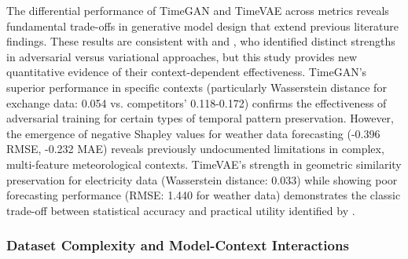 \documentclass{article}
\begin{document}
The differential performance of TimeGAN and TimeVAE across metrics reveals fundamental trade-offs in generative model design that extend previous literature findings. These results are consistent with \cite{yoon_time-series_2019} and \cite{desai_timevae_2021}, who identified distinct strengths in adversarial versus variational approaches, but this study provides new quantitative evidence of their context-dependent effectiveness. TimeGAN's superior performance in specific contexts (particularly Wasserstein distance for exchange data: 0.054 vs. competitors' 0.118-0.172) confirms the effectiveness of adversarial training for certain types of temporal pattern preservation. However, the emergence of negative Shapley values for weather data forecasting (-0.396 RMSE, -0.232 MAE) reveals previously undocumented limitations in complex, multi-feature meteorological contexts. TimeVAE's strength in geometric similarity preservation for electricity data (Wasserstein distance: 0.033) while showing poor forecasting performance (RMSE: 1.440 for weather data) demonstrates the classic trade-off between statistical accuracy and practical utility identified by \cite{lu_machine_2024}.

\subsubsection{Dataset Complexity and Model-Context Interactions}


\end{document}
